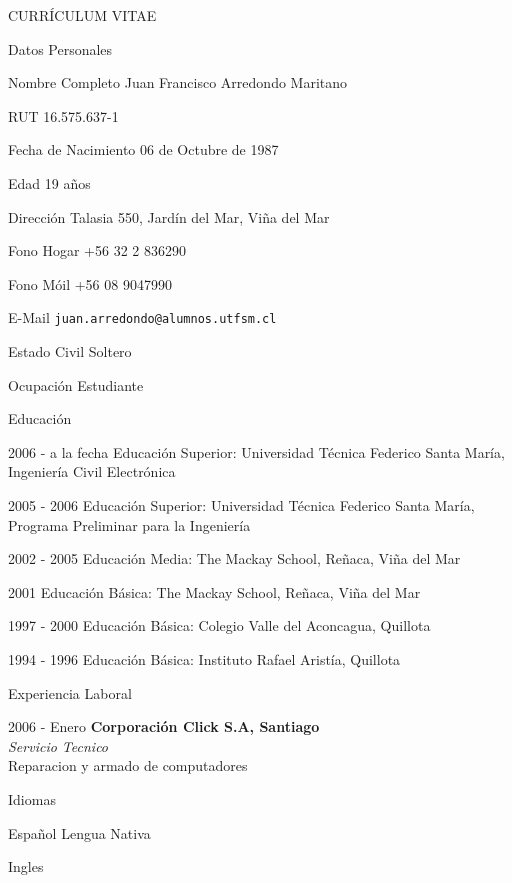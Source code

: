 \documentclass{article}
\begin{document}
\setlength{\cvlabelwidth}{45mm}
\begin{cv}{CURR\'ICULUM VITAE}

\begin{cvlist}{Datos Personales}
\item[Nombre Completo] Juan Francisco Arredondo Maritano
\item[RUT] 16.575.637-1
\item[Fecha de Nacimiento] 06 de Octubre de 1987
\item[Edad] 19 a\~nos
\item[Direcci\'on] Talasia 550, Jard\'in del Mar, Vi\~na del Mar
\item[Fono Hogar] +56 32 2 836290
\item[Fono M\'oil] +56 08 9047990
\item[E-Mail] \texttt{juan.arredondo@alumnos.utfsm.cl}
\item[Estado Civil] Soltero
\item[Ocupaci\'on] Estudiante
\end{cvlist}

\begin{cvlist}{Educaci\'on}
\item[2006 - a la fecha] Educaci\'on Superior: Universidad T\'ecnica Federico Santa Mar\'ia, Ingenier\'ia Civil Electr\'onica
\item[2005 - 2006] Educaci\'on Superior: Universidad T\'ecnica Federico Santa Mar\'ia, Programa Preliminar para la Ingenier\'ia
\item[2002 - 2005] Educaci\'on Media: The Mackay School, Re\~naca, Vi\~na del Mar
\item[2001       ] Educaci\'on B\'asica: The Mackay School, Re\~naca, Vi\~na del Mar
\item[1997 - 2000] Educaci\'on B\'asica: Colegio Valle del Aconcagua, Quillota
\item[1994 - 1996] Educaci\'on B\'asica: Instituto Rafael Arist\'ia, Quillota
\end{cvlist}

\begin{cvlist}{Experiencia Laboral}
\item[2006 - Enero] \textbf{Corporaci\'on Click S.A, Santiago}\\\textit{Servicio Tecnico}\\Reparacion y armado de computadores
\end{cvlist}

\begin{cvlist}{Idiomas}
\item[] Espa\~nol Lengua Nativa
\item[] Ingles
\end{cvlist}


\end{cv}
\end{document}
